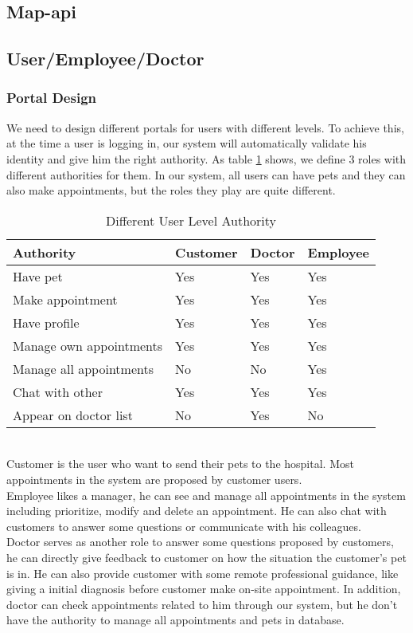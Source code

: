 \documentclass[a4paper]{article}
\begin{document}
\subsection{Map-api}
\subsection{User/Employee/Doctor}

\subsubsection{Portal Design}
We need to design different portals for users with different levels. To achieve this, at the time a user is logging in, our system will automatically validate his identity and give him the right authority. As table \ref{authority} shows, we define 3 roles with different authorities for them. In our system, all users can have pets and they can also make appointments, but the roles they play are quite different.
\begin{table}[h]
    \centering
    \begin{tabular}[h]{l|lll}
        \hline
        Authority & Customer & Doctor & Employee \\ \hline
        Have pet & Yes & Yes & Yes \\
        Make appointment & Yes & Yes & Yes \\
        Have profile & Yes & Yes & Yes\\
        Manage own appointments & Yes & Yes & Yes \\
        Manage all appointments & No & No & Yes \\
        Chat with other & Yes & Yes & Yes \\
        Appear on doctor list & No & Yes & No
    \end{tabular}
    \caption{Different User Level Authority}
    \label{authority}
\end{table}
\quad\\
Customer is the user who want to send their pets to the hospital. Most appointments in the system are proposed by customer users.
\quad \\
Employee likes a manager, he can see and manage all appointments in the system including prioritize, modify and delete an appointment. He can also chat with customers to answer some questions or communicate with his colleagues. 
\quad\\
Doctor serves as another role to answer some questions proposed by customers, he can directly give feedback to customer on how the situation the customer's pet is in. He can also provide customer with some remote professional guidance, like giving a initial diagnosis before customer make on-site appointment. In addition, doctor can check appointments related to him through our system, but he don't have the authority to manage all appointments and pets in database.
\end{document}
